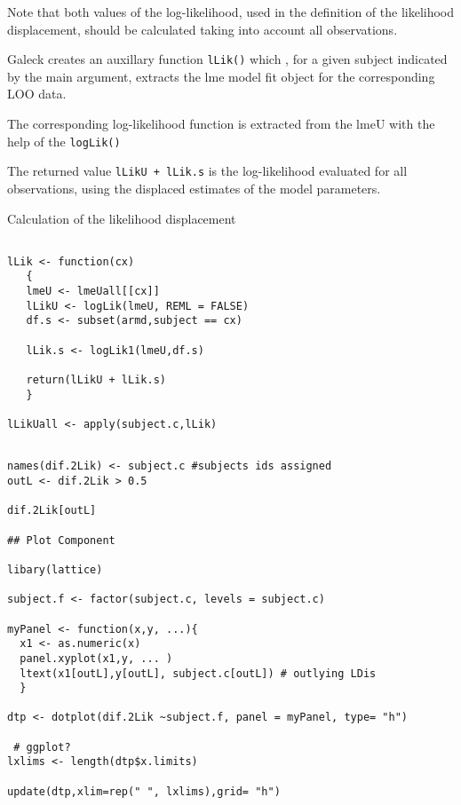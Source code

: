 \documentclass[a4paper,12pt]{article}
\begin{document}
Note that both values of the log-likelihood, used in the definition of the likelihood displacement, should be 
calculated taking into account all observations.



Galeck creates an auxillary function \texttt{lLik()} which , for a given subject indicated by the main argument, extracts the lme model fit object for the
corresponding LOO data.


The corresponding log-likelihood function is extracted from the lmeU with the help of the \texttt{logLik()}


The returned value \texttt{lLikU + lLik.s} is the log-likelihood evaluated for all observations, using the displaced estimates of the model parameters.


Calculation of the likelihood displacement

\begin{framed}
\begin{verbatim}

lLik <- function(cx)
   {
   lmeU <- lmeUall[[cx]]
   lLikU <- logLik(lmeU, REML = FALSE)
   df.s <- subset(armd,subject == cx)
 
   lLik.s <- logLik1(lmeU,df.s)

   return(lLikU + lLik.s)
   }

lLikUall <- apply(subject.c,lLik)

\end{verbatim}
\end{framed}

%

\begin{framed}
\begin{verbatim}

names(dif.2Lik) <- subject.c #subjects ids assigned
outL <- dif.2Lik > 0.5

dif.2Lik[outL]

## Plot Component

libary(lattice)

subject.f <- factor(subject.c, levels = subject.c)

myPanel <- function(x,y, ...){
  x1 <- as.numeric(x)
  panel.xyplot(x1,y, ... )
  ltext(x1[outL],y[outL], subject.c[outL]) # outlying LDis
  }

dtp <- dotplot(dif.2Lik ~subject.f, panel = myPanel, type= "h")

 # ggplot?
lxlims <- length(dtp$x.limits)

update(dtp,xlim=rep(" ", lxlims),grid= "h")
\end{verbatim}
\end{framed}
\end{document}
